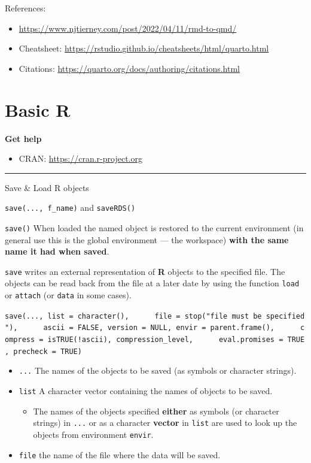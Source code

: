 \documentclass[
  a4paper,
  twoside,
  openright]{book}
\providecommand{\tightlist}{%
  \setlength{\itemsep}{0pt}\setlength{\parskip}{0pt}}
\theoremstyle{definition}
\theoremstyle{definition}
\theoremstyle{definition}
\theoremstyle{definition}
\theoremstyle{remark}
\begin{document}
References:

\begin{itemize}
\tightlist
\item
  \url{https://www.njtierney.com/post/2022/04/11/rmd-to-qmd/}
\item
  Cheatsheet: \url{https://rstudio.github.io/cheatsheets/html/quarto.html}
\item
  Citations: \url{https://quarto.org/docs/authoring/citations.html}
\end{itemize}

\chapter{Basic R}\label{basic-r}

\textbf{Get help}

\begin{itemize}
\tightlist
\item
  CRAN: \url{https://cran.r-project.org}
\end{itemize}

\begin{center}\rule{0.5\linewidth}{0.5pt}\end{center}

Save \& Load R objects

\texttt{save(...,\ f\_name)} and \texttt{saveRDS()}

\texttt{save()} When loaded the named object is restored to the current environment (in general use this is the global environment --- the workspace) \textbf{with the same name it had when saved}.

\texttt{save} writes an external representation of \textbf{R} objects to the specified file. The objects can be read back from the file at a later date by using the function \texttt{load} or \texttt{attach} (or \texttt{data} in some cases).

\texttt{save(...,\ list\ =\ character(),\ \ \ \ \ \ file\ =\ stop("\textquotesingle{}file\textquotesingle{}\ must\ be\ specified"),\ \ \ \ \ \ ascii\ =\ FALSE,\ version\ =\ NULL,\ envir\ =\ parent.frame(),\ \ \ \ \ \ compress\ =\ isTRUE(!ascii),\ compression\_level,\ \ \ \ \ \ eval.promises\ =\ TRUE,\ precheck\ =\ TRUE)}

\begin{itemize}
\tightlist
\item
  \texttt{...} The names of the objects to be saved (as symbols or character strings).
\item
  \texttt{list} A character vector containing the names of objects to be saved.

  \begin{itemize}
  \tightlist
  \item
    The names of the objects specified \textbf{either} as symbols (or character strings) in \texttt{...} or as a character \textbf{vector} in \texttt{list} are used to look up the objects from environment \texttt{envir}.
  \end{itemize}
\item
  \texttt{file} the name of the file where the data will be saved.
\end{itemize}
\end{document}

